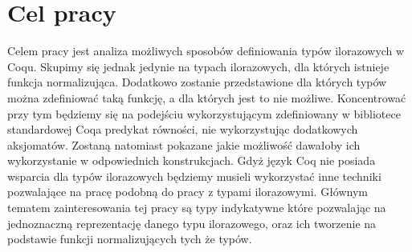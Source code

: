 \section{Cel pracy}
Celem pracy jest analiza możliwych sposobów definiowania typów ilorazowych w Coqu. Skupimy się jednak jedynie na typach ilorazowych, dla których istnieje funkcja normalizująca. Dodatkowo zostanie przedstawione dla których typów można zdefiniować taką funkcję, a dla których jest to nie możliwe. Koncentrować przy tym będziemy się na podejściu wykorzystującym zdefiniowany w bibliotece standardowej Coqa predykat równości, nie wykorzystując dodatkowych aksjomatów. Zostaną natomiast pokazane jakie możliwość dawałoby ich wykorzystanie w odpowiednich konstrukcjach. Gdyż język Coq nie posiada wsparcia dla typów ilorazowych będziemy musieli wykorzystać inne techniki pozwalające na pracę podobną do pracy z typami ilorazowymi. Głównym tematem zainteresowania tej pracy są typy indykatywne które pozwalając na jednoznaczną reprezentację danego typu ilorazowego, oraz ich tworzenie na podstawie funkcji normalizujących tych że typów. 

